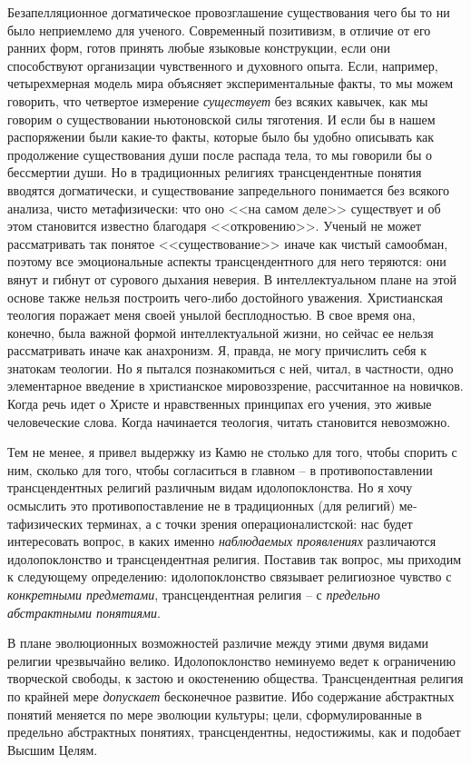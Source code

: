 \documentclass{book}
\begin{document}
Безапелляционное догматическое провозглашение существования чего бы то ни было неприемлемо для ученого. Современ­ный позитивизм, в отличие от его ранних форм, готов принять любые языковые конструкции, если они способствуют организации чувственного и духовного опыта. Если, например, четырехмерная модель мира объясняет экспериментальные факты, то мы можем говорить, что четвертое измерение \textit{существует} без всяких кавычек, как мы говорим о существовании ньютоновской силы тяготения. И если бы в нашем распоряжении были какие-то факты, которые было бы удобно описывать как продолжение существования души после распада тела, то мы говорили бы о бессмертии души. Но в традиционных религиях трансцендентные понятия вводятся догматически, и существование запредельного понимается без всякого анализа, чисто метафизически: что оно <<на самом деле>> существует и об этом становится известно благодаря <<откровению>>. Уче­ный не может рассматривать так понятое <<существование>> иначе как чистый самообман, поэтому все эмоциональные 
ас­пекты трансцендентного для него теряются: они вянут и гибнут от сурового дыхания неверия. В интеллектуальном плане на этой основе также нельзя построить чего-либо достойного уважения. Христианская теология поражает меня своей уны­лой бесплодностью. В свое время она, конечно, была важной формой интеллектуальной жизни, но сейчас ее нельзя рассматривать иначе как анахронизм. Я, правда, не могу причислить себя к знатокам теологии. Но я пытался познакомиться с ней, читал, в частности, одно элементарное введение в христианское мировоззрение, рассчитанное на новичков. Когда речь идет о Христе и нравственных принципах его учения, это живые человеческие слова. Когда начинается теология, читать стано­вится невозможно.

Тем не менее, я привел выдержку из Камю не столько для того, чтобы спорить с ним, сколько для того, чтобы согласиться в главном -- в противопоставлении трансцендентных религий различным видам идолопоклонства. Но я хочу осмыслить это противопоставление не в традиционных (для религий) ме­тафизических терминах, а с точки зрения операционалистской: нас будет интересовать вопрос, в каких именно \textit{наблюдаемых проявлениях}  различаются идолопоклонство и трансцендент­ная религия. Поставив так вопрос, мы приходим к следующему определению: идолопоклонство связывает религиозное чувст­во с \textit{конкретными предметами},  трансцендентная религия -- с \textit{предельно абстрактными понятиями}. 

В плане эволюционных возможностей различие между этими двумя видами религии чрезвычайно велико. Идолопоклонство неминуемо ведет к ограничению творческой свободы, к застою и окостенению общества. Трансцендентная религия по край­ней мере \textit{допускает}  бесконечное развитие. Ибо содержание аб­страктных понятий меняется по мере эволюции культуры; це­ли, сформулированные в предельно абстрактных понятиях, трансцендентны, недостижимы, как и подобает Высшим Целям.
\end{document}

